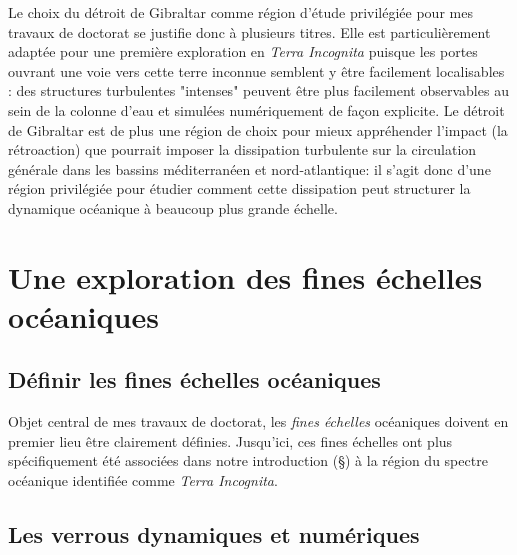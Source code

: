 Le choix du détroit de Gibraltar comme région d'étude privilégiée pour mes travaux de doctorat se justifie donc à plusieurs titres. Elle est particulièrement adaptée pour une première exploration en \textit{Terra Incognita} puisque les portes ouvrant une voie vers cette terre inconnue semblent y être facilement localisables : des structures turbulentes "intenses" peuvent être plus facilement observables au sein de la colonne d'eau et simulées numériquement de façon explicite. Le détroit de Gibraltar est de plus une région de choix pour mieux appréhender l'impact (la rétroaction) que pourrait imposer la dissipation turbulente sur la circulation générale dans les bassins méditerranéen et nord-atlantique: il s'agit donc d'une région privilégiée pour étudier comment cette dissipation peut structurer la dynamique océanique à beaucoup plus grande échelle.


\section{Une exploration des fines échelles océaniques}
\subsection{Définir les fines échelles océaniques}
Objet central de mes travaux de doctorat, les \textit{fines échelles} océaniques doivent en premier lieu être clairement définies. Jusqu'ici, ces fines échelles ont plus spécifiquement été associées dans notre introduction (\S {}) à la région du spectre océanique identifiée comme \textit{Terra Incognita}.\\

\noindent{}

\subsection{Les verrous dynamiques et numériques}
\label{subsection_verrous}

